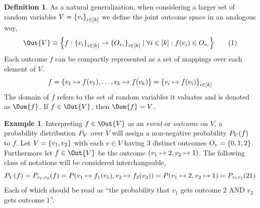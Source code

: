 \documentclass[aps, 10pt, english, twoside, pra, nofootinbib, longbibliography]{revtex4-1}
\theoremstyle{plain}
\theoremstyle{definition}
\newtheorem{definition}[theorem]{Definition}
\newtheorem{example}[theorem]{Example}
\theoremstyle{remark}
\newcommand{\outc}[1]{o\bs{#1}} %
\begin{document}
    \begin{definition}
        As a natural generalization, when considering a larger set of random variables $V = \bc{v_i}_{i \in \bs{k}}$ we define the joint outcome space in an analogous way,
        \[ \Out{V} \defined \bc{f: \bc{v_i}_{i \in \bs{k}} \to \bc{O_{v_i}}_{i \in \bs{k}} \mid \forall i \in \bs{k} : f\br{v_i} \in O_{v_i} } \eq \label{eq:outcome_space}\]
        Each outcome $f$ can be compactly represented as a set of mappings over each element of $V$.
        \[ f = \bc{v_1 \mapsto f\br{v_1}, \ldots, v_k \mapsto f\br{v_k}} = \bc{v_i\mapsto f\br{v_i}}_{i \in \bs{k}} \]
        The domain of $f$ refers to the set of random variables it valuates and is denoted as $\Dom{f}$. If $f \in \Out{V}$, then $\Dom{f} = V$.

    \end{definition}

    \begin{example}
        Interpreting $f \in \Out{V}$ as an \textit{event} or \textit{outcome} on $V$, a probability distribution $\prob[V]$ over $V$ will assign a non-negative probability $\prob[V][f]$ to $f$. Let $V = \bc{v_1, v_2}$ with each $v \in V$ having $3$ distinct outcomes $O_v = \bc{0,1,2}$. Furthermore let $f \in \Out{V}$ be the outcome $\br{v_1 \mapsto 2, v_2 \mapsto 1}$. The following class of notations will be considered interchangeable,
        \[ \prob[V][f] = \prob[v_1, v_2][f] = \prob[][v_1 \mapsto f_1\br{v_1}, v_2 \mapsto f_2\br{v_2}] = \prob[][v_1 \mapsto 2, v_2 \mapsto 1] = \prob[v_1v_2][21] \]
        Each of which should be read as ``the probability that $v_1$ gets outcome $2$ AND $v_2$ gets outcome $1$''.
    \end{example}
\end{document}
